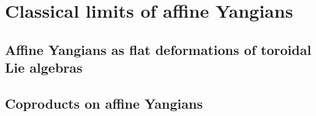\section{Classical limits of affine Yangians}
    \subsection{Affine Yangians as flat deformations of toroidal Lie algebras}

    \subsection{Coproducts on affine Yangians}